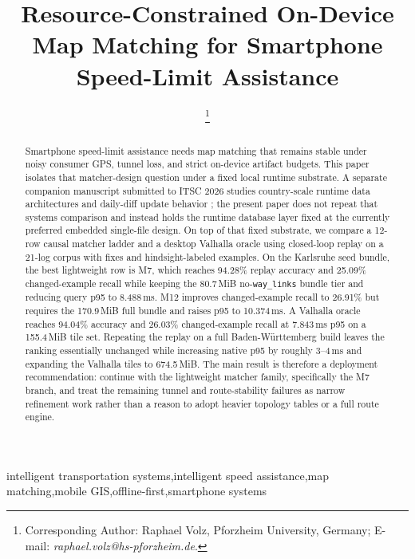 \documentclass{IOS-Book-Article}
\def\hb{\hbox to 11.5 cm{}}
\begin{document}
\hypersetup{pageanchor=false}
\pagestyle{headings}
\def\thepage{}

\begin{frontmatter}

\title{Resource-Constrained On-Device Map Matching for Smartphone Speed-Limit Assistance}

\markboth{}{\hb}

\author[A]{ %
\thanks{Corresponding Author: Raphael Volz, Pforzheim University, Germany; E-mail: \textit{raphael.volz@hs-pforzheim.de}.}}

\address[A]{Pforzheim University, Germany}

\begin{abstract}
Smartphone speed-limit assistance needs map matching that remains stable under noisy consumer GPS, tunnel loss, and strict on-device artifact budgets. This paper isolates that matcher-design question under a fixed local runtime substrate. A separate companion manuscript submitted to ITSC 2026 studies country-scale runtime data architectures and daily-diff update behavior \cite{volz2026itsc_runtime}; the present paper does not repeat that systems comparison and instead holds the runtime database layer fixed at the currently preferred embedded single-file design. On top of that fixed substrate, we compare a 12-row causal matcher ladder and a desktop Valhalla oracle using closed-loop replay on a 21-log corpus with \MatcherLadderCorpusFixes{} fixes and \MatcherLadderPseudoExamples{} hindsight-labeled examples. On the Karlsruhe seed bundle, the best lightweight row is M7, which reaches 94.28\% replay accuracy and 25.09\% changed-example recall while keeping the 80.7\,MiB no-\texttt{way\_links} bundle tier and reducing query p95 to 8.488\,ms. M12 improves changed-example recall to 26.91\% but requires the 170.9\,MiB full bundle and raises p95 to 10.374\,ms. A Valhalla oracle reaches 94.04\% accuracy and 26.03\% changed-example recall at 7.843\,ms p95 on a 155.4\,MiB tile set. Repeating the replay on a full Baden-W\"urttemberg build leaves the ranking essentially unchanged while increasing native p95 by roughly 3--4\,ms and expanding the Valhalla tiles to 674.5\,MiB. The main result is therefore a deployment recommendation: continue with the lightweight matcher family, specifically the M7 branch, and treat the remaining tunnel and route-stability failures as narrow refinement work rather than a reason to adopt heavier topology tables or a full route engine.
\end{abstract}

\begin{keyword}
intelligent transportation systems\sep intelligent speed assistance\sep map matching\sep mobile GIS\sep offline-first\sep smartphone systems
\end{keyword}
\end{frontmatter}
\end{document}
